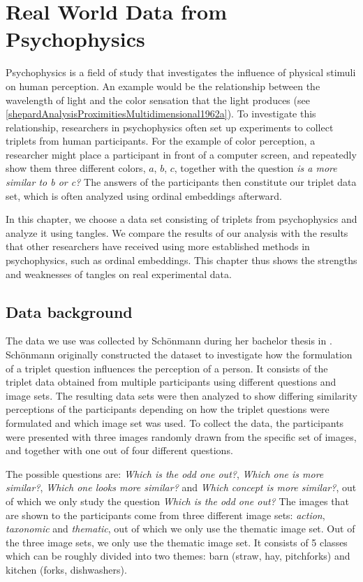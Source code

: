 \chapter{Real World Data from Psychophysics}\label{real}
Psychophysics is a field of study that investigates the influence of physical stimuli on human perception. An example would be the relationship between the wavelength of 
light and the color sensation that the light produces (see \autoref{shepardAnalysisProximitiesMultidimensional1962a}). To investigate this relationship, researchers in psychophysics
often set up experiments to collect triplets from human participants. For the example of color perception, a researcher might place a participant in front of a computer 
screen, and repeatedly show them three different colors, $a$, $b$, $c$, together with the question \textit{is a more similar to b or c?} 
The answers of the participants then constitute our triplet data set, which is often analyzed using ordinal embeddings afterward.

In this chapter, we choose a data set consisting of triplets from psychophysics and analyze it using tangles. 
We compare the results of our analysis with the results that other researchers have received using more established methods in psychophysics, such as ordinal embeddings.
This chapter thus shows the strengths and weaknesses of tangles on real experimental data.

\section{Data background}
The data we use was collected by Schönmann during her bachelor thesis in \cite{inesschonmannSimilarityJudgementsNatural2021}. Schönmann originally
constructed the dataset to investigate how the formulation of a triplet question influences 
the perception of a person. It consists of the triplet data obtained from multiple
participants using different questions and image sets.  The resulting data sets were then analyzed to show differing similarity perceptions of the
participants depending on how the triplet questions were formulated and which image set was used.
To collect the data, the participants were presented with three images randomly drawn from the specific set of images, and together with one out of four different questions. 

The possible questions are: \textit{Which is the odd one out?}, \textit{Which one is more similar?},
\textit{Which one looks more similar?} and \textit{Which concept is more similar?}, out of which we only study the question \textit{Which is the odd one out?} 
The images that are shown to the participants come from three different image sets: \textit{action}, \textit{taxonomic} and \textit{thematic}, out of which we only use the thematic image set.
Out of the three image sets, we only use the thematic image set. It consists of 5 classes which can be roughly divided into two themes: barn (straw, hay, pitchforks) and kitchen (forks, dishwashers).

